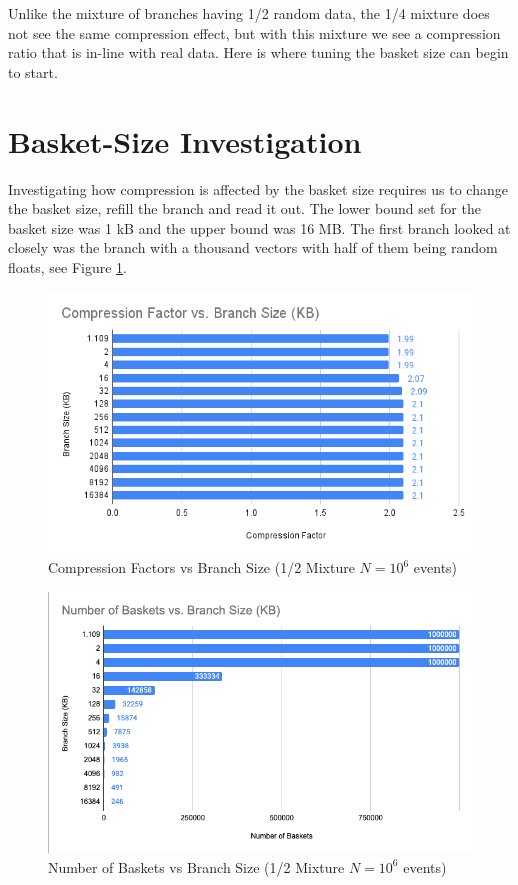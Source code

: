 Unlike the mixture of branches having 1/2 random data, the 1/4 mixture does not see the same compression effect, but with this mixture we see a compression ratio that is in-line with real data.
Here is where tuning the basket size can begin to start.

\section{Basket-Size Investigation}
\label{sec: toy-model basket-size investigation}

Investigating how compression is affected by the basket size requires us to change the basket size, refill the branch and read it out.
The lower bound set for the basket size was 1 kB and the upper bound was 16 MB.
The first branch looked at closely was the branch with a thousand vectors with half of them being random floats, see Figure \ref{fig:toymodel_CFvsBranchSize_1/2mixture}.

\begin{figure}[h]
    \centering
    \includegraphics[width=.8\textwidth]{content/toymodel_content/Compression Factor vs. Branch Size (KB).png}
    \caption{Compression Factors vs Branch Size (1/2 Mixture $N=10^6$ events)}
    \label{fig:toymodel_CFvsBranchSize_1/2mixture}
\end{figure}

\begin{figure}[h]
    \centering
    \includegraphics[width=.8\textwidth]{content/toymodel_content/Number of Baskets vs Branch Size.png}
    \caption{Number of Baskets vs Branch Size (1/2 Mixture $N=10^6$ events)}
    \label{fig:toymodel_NumBasketsvsBranchSize_1/2mixture}
\end{figure}

